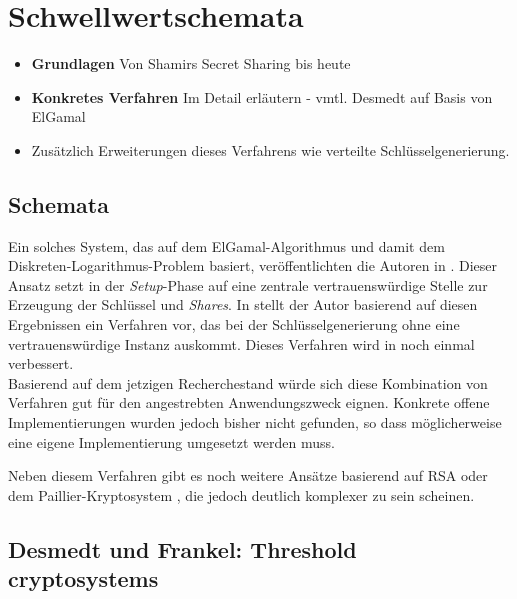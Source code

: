 \section{Schwellwertschemata}

\begin{itemize}
  \item \textbf{Grundlagen} Von Shamirs Secret Sharing bis heute
  \item \textbf{Konkretes Verfahren} Im Detail erläutern - vmtl. Desmedt auf Basis von ElGamal
  \item Zusätzlich Erweiterungen dieses Verfahrens wie verteilte Schlüsselgenerierung.
\end{itemize}


\label{sec_state_threshold}

\subsection{Schemata}


Ein solches System, das auf dem ElGamal-Algorithmus und damit dem Diskreten-Logarithmus-Problem basiert, veröffentlichten die Autoren in \cite{DesmedtFrankel1990}.  Dieser Ansatz setzt in der \textit{Setup}-Phase auf eine zentrale vertrauenswürdige Stelle zur Erzeugung der Schlüssel und \textit{Shares}. In \cite{pedersen1991} stellt der Autor basierend auf diesen Ergebnissen ein Verfahren vor, das bei der Schlüsselgenerierung ohne eine vertrauenswürdige Instanz auskommt. Dieses Verfahren wird in \cite{gennaro1999} noch einmal verbessert.\\
Basierend auf dem jetzigen Recherchestand würde sich diese Kombination von Verfahren gut für den angestrebten Anwendungszweck eignen. Konkrete offene Implementierungen wurden jedoch bisher nicht gefunden, so dass möglicherweise eine eigene Implementierung umgesetzt werden muss.

Neben diesem Verfahren gibt es noch weitere Ansätze basierend auf RSA \cite{desmedt1993, nguyen2005} oder dem Paillier-Kryptosystem \cite{paillier1999, damgard2001}, die jedoch deutlich komplexer zu sein scheinen. 

\subsection{Desmedt und Frankel: Threshold cryptosystems}

